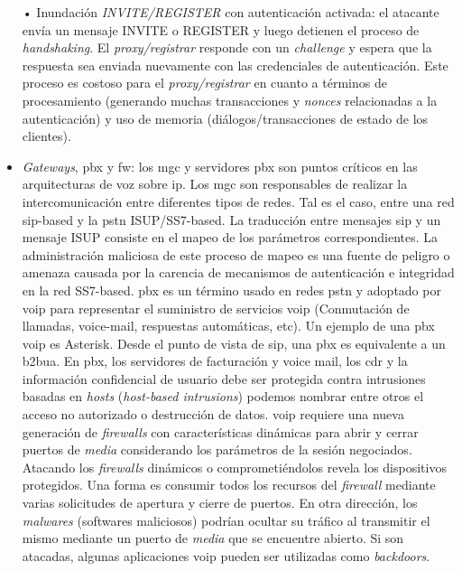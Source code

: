 \documentclass[a4paper,12pt]{report}
\begin{document}
\begin{itemize}
• Inundación \emph{INVITE/REGISTER} con autenticación activada: el atacante envía un
mensaje INVITE o REGISTER y luego detienen el proceso de \emph{handshaking}. El
\emph{proxy/registrar} responde con un \emph{challenge} y espera que la respuesta sea
enviada nuevamente con las credenciales de autenticación. Este proceso es
costoso para el \emph{proxy/registrar} en cuanto a términos de procesamiento (generando
muchas transacciones y \emph{nonces} relacionadas a la autenticación) y uso de
memoria (diálogos/transacciones de estado de los clientes). 

\item \emph{Gateways}, \ac{pbx} y \ac{fw}:
los \ac{mgc} y servidores \ac{pbx} son puntos críticos en las
arquitecturas de voz sobre \ac{ip}. Los \ac{mgc} son responsables de realizar la
intercomunicación entre diferentes tipos de redes. Tal es el caso, entre una red
\ac{sip}-based y la \ac{pstn} ISUP/SS7-based. La traducción entre mensajes \ac{sip} y un
mensaje ISUP consiste en el mapeo de los parámetros correspondientes. La
administración maliciosa de este proceso de mapeo es una fuente de peligro o
amenaza causada por la carencia de mecanismos de autenticación e integridad en
la red SS7-based. \ac{pbx} es un término usado en redes \ac{pstn} y adoptado por \ac{voip}
para representar el suministro de servicios \ac{voip} (Conmutación de llamadas,
voice-mail, respuestas automáticas, etc). Un ejemplo de una \ac{pbx} \ac{voip} es
Asterisk. Desde el punto de vista de \ac{sip}, una \ac{pbx} es equivalente a
un \ac{b2bua}. En \ac{pbx}, los servidores de facturación y
voice mail, los \ac{cdr} y
la información confidencial de usuario debe ser protegida contra intrusiones
basadas en \emph{hosts} (\emph{host-based intrusions}) podemos nombrar entre otros el acceso no autorizado o
destrucción de datos. 
\ac{voip} requiere una nueva generación de \emph{firewalls} con características dinámicas
para abrir y cerrar puertos de \emph{media} considerando los parámetros de la sesión
negociados. Atacando los \emph{firewalls} dinámicos o comprometiéndolos revela los
dispositivos protegidos. Una forma es consumir todos los recursos del \emph{firewall}
mediante varias solicitudes de apertura y cierre de puertos. En otra dirección,
los \emph{malwares} (softwares maliciosos) podrían ocultar su tráfico al
transmitir el mismo mediante un puerto de \emph{media} que se encuentre abierto. Si
son atacadas, algunas aplicaciones \ac{voip} pueden ser utilizadas como
\emph{backdoors}.



\end{itemize}
\end{document}
